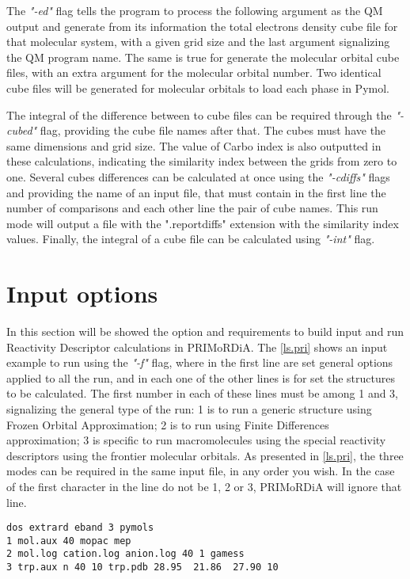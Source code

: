 \documentclass[a4paper,11pt]{refart}
\begin{document}
The \emph{"-ed"} flag tells the program to process the following argument as the QM output and generate from its information the total electrons density cube file for that molecular system, with a given grid size and the last argument signalizing the QM program name. The same is true for generate the molecular orbital cube files, with an extra argument for the molecular orbital number. Two identical cube files will be generated for molecular orbitals to load each phase in Pymol. 

The integral of the difference between to cube files can be required through the \emph{"-cubed"} flag, providing the cube file names after that. The cubes must have the same dimensions and grid size. The value of Carbo index is also outputted in these calculations, indicating the similarity index between the grids from zero to one. Several cubes differences can be calculated at once using the \emph{"-cdiffs"} flags and providing the name of an input file, that must contain in the first line the number of comparisons and each other line the pair of cube names. This run mode will output a file with the ".reportdiffs" extension with the similarity index values. Finally, the integral of a cube file can be calculated using \emph{"-int"} flag. 


\section{Input options}

In this section will be showed the option and requirements to build input and run Reactivity Descriptor calculations in PRIMoRDiA. The \autoref{ls.pri} shows an input example to run using the \emph{"-f"} flag, where in the first line are set general options applied to all the run, and in each one of the other lines is for set the structures to be calculated. The first number in each of these lines must be among 1 and 3, signalizing the general type of the run: 1 is to run a generic structure using Frozen Orbital Approximation; 2 is to run using Finite Differences approximation; 3 is specific to run macromolecules using the special reactivity descriptors using the frontier molecular orbitals.  As presented in \autoref{ls.pri}, the three modes can be required in the same input file, in any order you wish. In the case of the first character in the line do not be 1, 2 or 3, PRIMoRDiA will ignore that line.   

\hspace*{-\leftmarginwidth}
\begin{minipage}{\fullwidth}
\begin{lstlisting}[caption=Example of input for reactivity descriptor calculations.,label={ls.pri}]
dos extrard eband 3 pymols
1 mol.aux 40 mopac mep
2 mol.log cation.log anion.log 40 1 gamess 
3 trp.aux n 40 10 trp.pdb 28.95  21.86  27.90 10 
\end{lstlisting}
\end{minipage}
\end{document}

